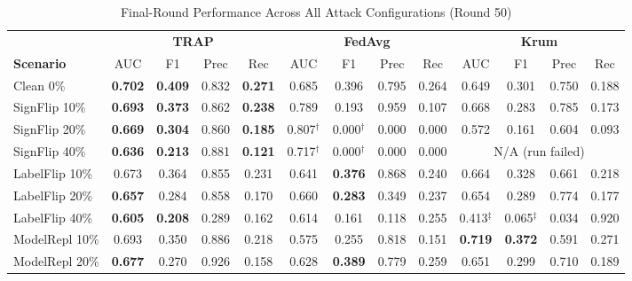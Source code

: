 \documentclass[journal]{IEEEtran}
\begin{document}
\begin{table}[!t]
\renewcommand{\arraystretch}{1.2}
\caption{Final-Round Performance Across All Attack Configurations (Round 50)}
\label{tab:attack_results}
\centering
\begin{tabular}{lcccc|cccc|cccc}
\toprule
 & \multicolumn{4}{c|}{\textbf{TRAP}} & \multicolumn{4}{c|}{\textbf{FedAvg}} & \multicolumn{4}{c}{\textbf{Krum}} \\
\cmidrule(lr){2-5}\cmidrule(lr){6-9}\cmidrule(lr){10-13}
\textbf{Scenario} & AUC & F1 & Prec & Rec & AUC & F1 & Prec & Rec & AUC & F1 & Prec & Rec \\
\midrule
Clean 0\%         & \textbf{0.702} & \textbf{0.409} & 0.832 & \textbf{0.271}
                  & 0.685 & 0.396 & 0.795 & 0.264
                  & 0.649 & 0.301 & 0.750 & 0.188 \\
\midrule
SignFlip 10\%     & \textbf{0.693} & \textbf{0.373} & 0.862 & \textbf{0.238}
                  & 0.789 & 0.193 & 0.959 & 0.107
                  & 0.668 & 0.283 & 0.785 & 0.173 \\
SignFlip 20\%     & \textbf{0.669} & \textbf{0.304} & 0.860 & \textbf{0.185}
                  & 0.807$^\dagger$ & 0.000$^\dagger$ & 0.000 & 0.000
                  & 0.572 & 0.161 & 0.604 & 0.093 \\
SignFlip 40\%     & \textbf{0.636} & \textbf{0.213} & 0.881 & \textbf{0.121}
                  & 0.717$^\dagger$ & 0.000$^\dagger$ & 0.000 & 0.000
                  & \multicolumn{4}{c}{N/A (run failed)} \\
\midrule
LabelFlip 10\%    & 0.673 & 0.364 & 0.855 & 0.231
                  & 0.641 & \textbf{0.376} & 0.868 & 0.240
                  & 0.664 & 0.328 & 0.661 & 0.218 \\
LabelFlip 20\%    & \textbf{0.657} & 0.284 & 0.858 & 0.170
                  & 0.660 & \textbf{0.283} & 0.349 & 0.237
                  & 0.654 & 0.289 & 0.774 & 0.177 \\
LabelFlip 40\%    & \textbf{0.605} & \textbf{0.208} & 0.289 & 0.162
                  & 0.614 & 0.161 & 0.118 & 0.255
                  & 0.413$^\ddagger$ & 0.065$^\ddagger$ & 0.034 & 0.920 \\
\midrule
ModelRepl 10\%    & 0.693 & 0.350 & 0.886 & 0.218
                  & 0.575 & 0.255 & 0.818 & 0.151
                  & \textbf{0.719} & \textbf{0.372} & 0.591 & 0.271 \\
ModelRepl 20\%    & \textbf{0.677} & 0.270 & 0.926 & 0.158
                  & 0.628 & \textbf{0.389} & 0.779 & 0.259
                  & 0.651 & 0.299 & 0.710 & 0.189 \\

\end{tabular}
\end{table}
\end{document}
